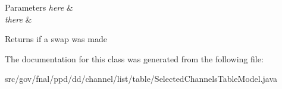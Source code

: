 \begin{DoxyParams}{Parameters}
{\em here} & \\
\hline
{\em there} & \\
\hline
\end{DoxyParams}
\begin{DoxyReturn}{Returns}
if a swap was made 
\end{DoxyReturn}


The documentation for this class was generated from the following file\-:\begin{DoxyCompactItemize}
\item 
src/gov/fnal/ppd/dd/channel/list/table/Selected\-Channels\-Table\-Model.\-java\end{DoxyCompactItemize}
